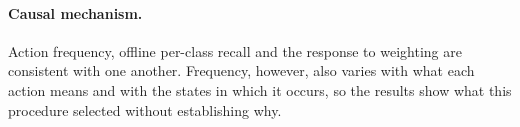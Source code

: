 \paragraph{Causal mechanism.}
Action frequency, offline per-class recall and the response to weighting are consistent with one
another. Frequency, however, also varies with what each action means and with the states in which
it occurs, so the results show what this procedure selected without establishing why.

